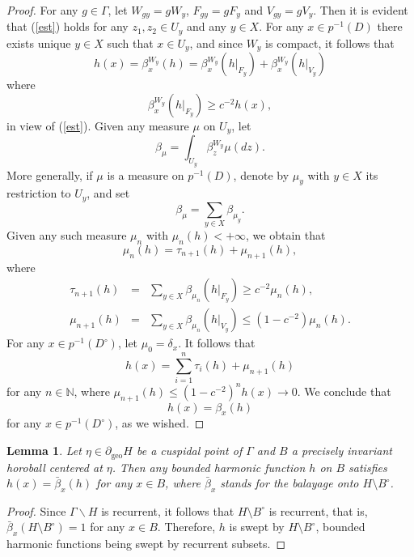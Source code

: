 \documentclass[12pt,a4paper]{amsart}
\numberwithin{equation}{section}
\newtheorem{lem}[equation]{Lemma}
\theoremstyle{definition}
\DeclareMathOperator{\geo}{geo}
\begin{document}
\begin{proof}
For any $g \in \Gamma$, let $W_{gy} = gW_y$, $F_{gy} = g F_y$ and $V_{gy} = g V_y$. Then it is evident that (\ref{est}) holds for any $z_1,z_2 \in U_y$ and any $y \in X$. For any $x \in p^{-1}(D)$ there exists unique $y \in X$ such that $x \in U_y$, and since $W_y$ is compact, it follows that 
\[
h(x) = \beta_x^{W_y}(h) = \beta_x^{W_y}(h|_{F_y}) + \beta_x^{W_y}(h|_{V_y}) 
\]
where
\[
\beta_x^{W_y}(h|_{F_y}) \geq c^{-2} h(x),
\]
in view of (\ref{est}). Given any measure $\mu$ on $U_y$, let
\[
\beta_{\mu} = \int_{U_y} \beta_z^{W_y} \mu(dz).
\]
More generally, if $\mu$ is a measure on $p^{-1}(D)$, denote by $\mu_{y}$ with $y \in X$ its restriction to $U_y$, and set
\[
\beta_\mu = \sum_{y \in X} \beta_{\mu_y}.
\]
Given any such measure $\mu_n$ with $\mu_n(h) < + \infty$, we obtain that
\[
\mu_n(h) = \tau_{n+1}(h) + \mu_{n+1}(h),
\]
where 
\begin{eqnarray}
\tau_{n+1}(h) &=& \sum_{y \in X} \beta_{\mu_n}(h|_{F_y}) \geq c^{-2} \mu_n(h), \nonumber \\
\mu_{n+1}(h) &=& \sum_{y \in X} \beta_{\mu_n}(h|_{V_y}) \leq (1-c^{-2}) \mu_n(h). \nonumber
\end{eqnarray}
For any $x \in p^{-1}(D^\circ)$, let $\mu_0 = \delta_x$. It follows that
\[
h(x) = \sum_{i=1}^{n} \tau_i(h) + \mu_{n+1}(h)
\]
for any $n \in \mathbb{N}$, where $\mu_{n+1}(h) \leq (1 - c^{-2})^n h(x) \rightarrow 0$. We conclude that
\[
h(x) = \beta_x(h)
\]
for any $x \in p^{-1}(D^\circ)$, as we wished.
\end{proof}

\begin{lem}\label{mean value prop}
Let $\eta \in \partial_{\geo} H$ be a cuspidal point of $\Gamma$ and $B$ a precisely invariant horoball centered at $\eta$. Then any bounded harmonic function $h$ on $B$ satisfies $h(x) = \bar{\beta}_x(h)$ for any $x \in B$, where $\bar{\beta}_x$ stands for the balayage onto $H \setminus B^\circ$.
\end{lem}

\begin{proof}
Since $\Gamma \backslash H$ is recurrent, it follows that $H \setminus B^\circ$ is recurrent, that is, $\bar{\beta}_x(H \setminus B^\circ) = 1$ for any $x \in B$. Therefore, $h$ is swept by $H \setminus B^\circ$, bounded harmonic functions being swept by recurrent subsets.
\end{proof}
\end{document}
